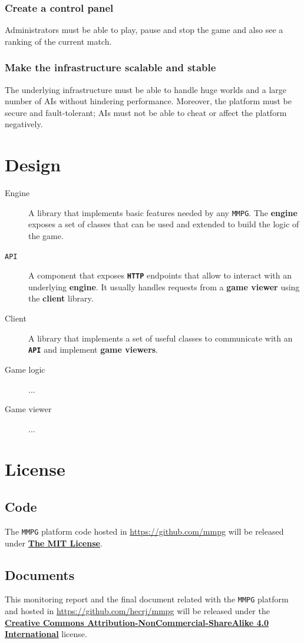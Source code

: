 \documentclass[a4paper,11pt,titlepage,abstract,numbers=noenddot,automark,mnsy,intlimits,rgb,dvipsnames]{report}
\begin{document}
\subsection{Create a control panel}
Administrators must be able to play, pause and stop the game and also see a ranking of the current match.
\subsection{Make the infrastructure scalable and stable}
The underlying infrastructure must be able to handle huge worlds and a large number of \texttt{}AI\texttt{}s without
hindering performance. Moreover, the platform must be secure and fault-tolerant; AIs must not be able to cheat
or affect the platform negatively.
\clearpage
\chapter{Design}
\label{design}
\begin{description}
\item[Engine]
A library that implements basic features needed by any \texttt{MMPG}. The \textbf{engine} exposes a set
  of classes that can be used and extended to build the logic of the game.
\item[\texttt{API}]
A component that exposes \textbf{\texttt{HTTP}} endpoints that allow to interact with an underlying \textbf{engine}. It
  usually handles requests from a \textbf{game viewer} using the \textbf{client} library.
\item[Client]
A library that implements a set of useful classes to communicate with an \textbf{\texttt{API}} and implement
  \textbf{game viewers}.
\item[Game logic]
...
\item[Game viewer]
...
\end{description}
\clearpage
\chapter{License}
\section{Code}
The \texttt{MMPG} platform code hosted in \url{https://github.com/mmpg} will be released under
\href{https://opensource.org/licenses/MIT}{\textbf{The MIT License}}.
\section{Documents}
This monitoring report and the final document related with the \texttt{MMPG} platform and hosted in
\url{https://github.com/hecrj/mmpg} will be released under the
\href{http://creativecommons.org/licenses/by-nc-sa/4.0/legalcode.txt}{\textbf{Creative Commons Attribution-NonCommercial-ShareAlike 4.0 International}}
license.
\clearpage
\end{document}
